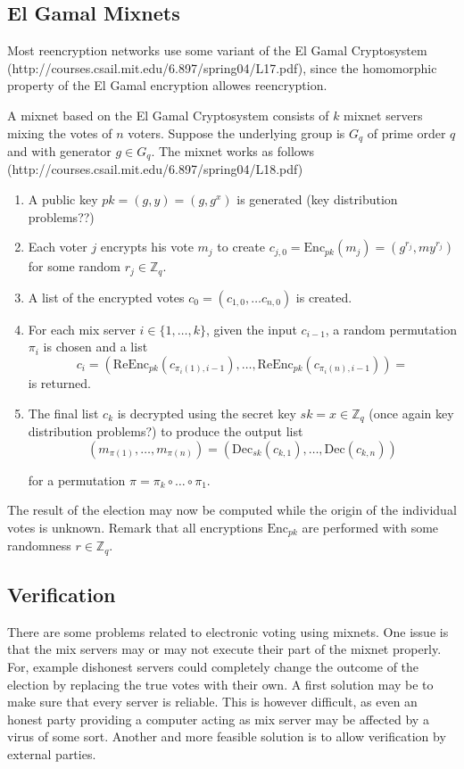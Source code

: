 \subsection{El Gamal Mixnets}

Most reencryption networks use some variant of the El Gamal
Cryptosystem (http://courses.csail.mit.edu/6.897/spring04/L17.pdf),
since the homomorphic property of the El Gamal encryption allowes
reencryption.

A mixnet based on the El Gamal Cryptosystem consists of $k$ mixnet
servers mixing the votes of $n$ voters. Suppose the underlying group
is $G_q$ of prime order $q$ and with generator $g \in G_q$. The mixnet
works as follows \\
(http://courses.csail.mit.edu/6.897/spring04/L18.pdf)

\begin{enumerate}
\item A public key $pk = (g,y) = (g, g^x)$ is generated (key distribution
  problems??)
\item Each voter $j$ encrypts his vote $m_j$ to create $c_{j,0} =
  \mathrm{Enc}_{pk}(m_j) = (g^{r_j},my^{r_j})$ for some random $r_j \in \mathbb{Z}_q$.
\item A list of the encrypted votes $c_0 = \left( c_{1,0},
  \hdots c_{n,0}\right)$ is created. 
\item For each mix server $i \in \{1,\hdots, k\}$, given the input
  $c_{i-1}$, a random permutation $\pi _i$ is chosen and a list 
  $$ 
  c_i =\left(\mathrm{ReEnc}_{pk}(c_{\pi_i(1),i-1}), \hdots,
  \mathrm{ReEnc}_{pk}(c_{\pi_i(n), i-1})\right) =
  $$
  is returned.
\item The final list $c_k$ is decrypted using the secret key $sk = x
  \in \mathbb{Z}_q$ (once again key distribution problems?) to produce
  the output list
 $$ 
  (m_{\pi (1)}, \hdots , m_{\pi (n)}) =
  \left(\mathrm{Dec}_{sk}(c_{k,1}), \hdots, \mathrm{Dec}(c_{k,n})\right)
  $$
  
  for a permutation $\pi = \pi_k \circ \hdots \circ \pi_1$.
\end{enumerate}

The result of the election may now be computed while the origin of the
individual votes is unknown. Remark that all encryptions
$\mathrm{Enc}_{pk}$ are performed with some randomness $r \in
\mathbb{Z}_q$.

\subsection{Verification}
There are some problems related to electronic voting using
mixnets. One issue is that the mix servers may or may not execute
their part of the mixnet properly. For, example dishonest servers
could completely change the outcome of the election by replacing the
true votes with their own. A first solution may be to make sure that
every server is reliable. This is however difficult, as even an honest
party providing a computer acting as mix server may be affected by a
virus of some sort. Another and more feasible solution is to allow
verification by external parties.


